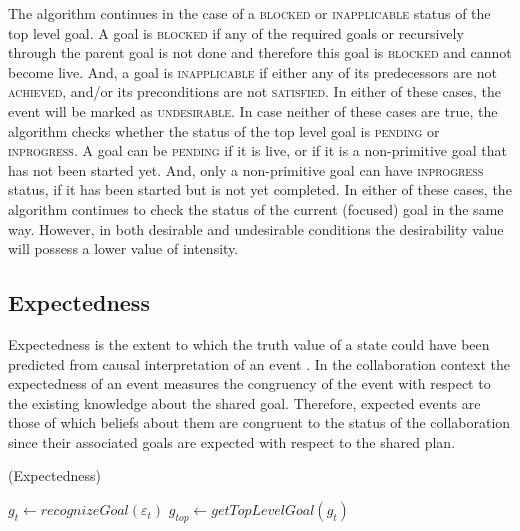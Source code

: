 \documentclass{aamas2016}
\begin{document}
The algorithm continues in the case of a \textsc{blocked} or
\textsc{inapplicable} status of the top level goal. A goal is \textsc{blocked}
if any of the required goals or recursively through the parent goal is not done
and therefore this goal is \textsc{blocked} and cannot become live. And, a
goal is \textsc{inapplicable} if either any of its predecessors are not
\textsc{achieved}, and/or its preconditions are not \textsc{satisfied}. In
either of these cases, the event will be marked as \textsc{undesirable}. In case
neither of these cases are true, the algorithm checks whether the status of the
top level goal is \textsc{pending} or \textsc{inprogress}. A goal can be
\textsc{pending} if it is live, or if it is a non-primitive goal that has not
been started yet. And, only a non-primitive goal can have \textsc{inprogress}
status, if it has been started but is not yet completed. In either of these
cases, the algorithm continues to check the status of the current (focused) goal
in the same way. However, in both desirable and undesirable conditions the
desirability value will possess a lower value of intensity.

\vspace*{-2mm}
\subsection{Expectedness}

Expectedness is the extent to which the truth value of a state could have been
predicted from causal interpretation of an event
\cite{marsella:ema-process-model}. In the collaboration context the expectedness
of an event measures the congruency of the event with respect to the existing
knowledge about the shared goal. Therefore, expected events are those of which
beliefs about them are congruent to the status of the collaboration since their
associated goals are expected with respect to the shared plan.

\begin{algorithm}
	\caption{(Expectedness)}
	\label{alg:expectedness}
	\begin{algorithmic}[1]
			\Statex
			\State $\mathit{g}_{t} \gets \textit{recognizeGoal}{(\varepsilon_t)}$
			\State $\mathit{g}_{top} \gets \textit{getTopLevelGoal}{(\mathit{g}_{t})}$
			\Statex
					\State {}
				\Else
					\State {}
				\EndIf
			\Else
					\State {}
				\Else
					\State {}
				\EndIf
			\EndIf
		\EndFunction
	\end{algorithmic}
\end{algorithm}
\end{document}
